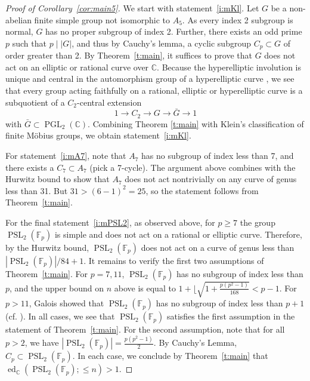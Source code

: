 \documentclass[11pt]{amsart}
\theoremstyle{definition}
\numberwithin{equation}{section}
\newcommand{\Cb}{\mathbb{C}}
\newcommand{\F}{\mathbb{F}}
\DeclareMathOperator{\PSL}{PSL}
\DeclareMathOperator{\ed}{ed}
\DeclareMathOperator{\PGL}{PGL}
\begin{document}
\begin{proof}[Proof of Corollary~\ref{cor:main5}]
    We start with statement~\ref{i:mKl}. Let $G$ be a non-abelian finite simple group not isomorphic to $A_5$. As every index 2 subgroup is normal, $G$ has no proper subgroup of index 2.  Further, there exists an odd prime $p$ such that $p\mid |G|$, and thus by Cauchy's lemma, a cyclic subgroup $C_p\subset G$ of order greater than 2. By Theorem~\ref{t:main}, it suffices to prove that $G$ does not act on an elliptic or rational curve over $\Cb$. Because the hyperelliptic involution is unique and central in the automorphism group of a hyperelliptic curve \cite[Ch. III, Corollaries 2, 3, p. 108]{FaKr}, we see that every group acting faithfully on a rational, elliptic or hyperelliptic curve is a subquotient of a $C_2$-central extension
    \[
	   1\to C_2\to G\to \bar{G}\to 1
    \]
    with $\bar{G}\subset \PGL_2(\Cb)$. Combining Theorem \ref{t:main} with Klein's \cite{KleinIcos} classification of finite M\"obius groups, we obtain statement~\ref{i:mKl}.

For statement~\ref{i:mA7}, note that $A_7$ has no subgroup of index less than 7, and there exists a $C_7\subset A_7$ (pick a 7-cycle). The argument above combines with the Hurwitz bound to show that $A_7$ does not act nontrivially on any curve of genus less than 31.  But $31>(6-1)^2=25$, so the statement follows from Theorem~\ref{t:main}.

    For the final statement~\ref{i:mPSL2}, as observed above, for $p\ge 7$ the group $\PSL_2(\F_p)$ is simple and does not act on a rational or elliptic curve. Therefore, by the Hurwitz bound, $\PSL_2(\F_p)$ does not act on a curve of genus less than $|\PSL_2(\F_p)|/84+1$. It remains to verify the first two assumptions of Theorem~\ref{t:main}. For $p=7,11$, $\PSL_2(\F_p)$ has no subgroup of index less than $p$, and the upper bound on $n$ above is equal to $1+\lfloor\sqrt{1+\frac{p(p^2-1)}{168}}<p-1$. For $p>11$, Galois showed that $\PSL_2(\F_p)$ has no subgroup of index less than $p+1$ (cf. \cite[p. 213]{Cooperstein}). In all cases, we see that $\PSL_2(\F_p)$ satisfies the first assumption in the statement of Theorem~\ref{t:main}.  For the second assumption, note that for all $p>2$, we have $|\PSL_2(\F_p)|=\frac{p(p^2-1)}{2}$.  By Cauchy's Lemma, $C_p\subset \PSL_2(\F_p)$. In each case, we conclude by Theorem~\ref{t:main} that $\ed_{\Cb}(\PSL_2(\F_p);\le n)>1$.
\end{proof}
\end{document}
